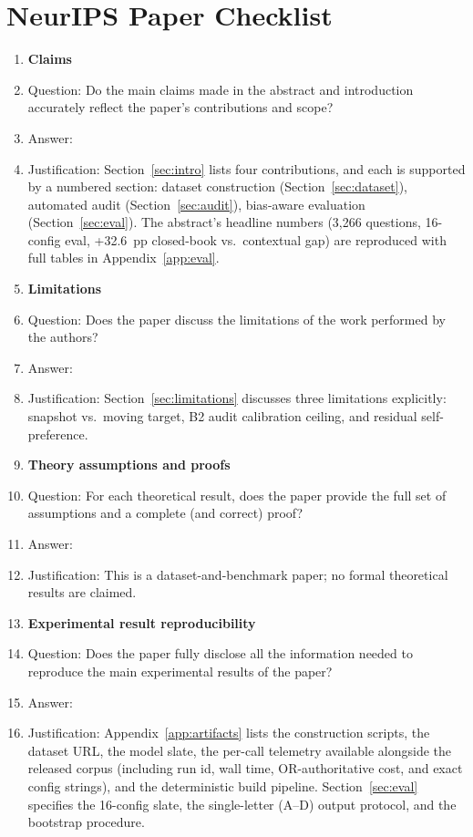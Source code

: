 \section*{NeurIPS Paper Checklist}

\begin{enumerate}

\item {\bf Claims}
    \item[] Question: Do the main claims made in the abstract and introduction accurately reflect the paper's contributions and scope?
    \item[] Answer: \answerYes{}
    \item[] Justification: Section~\ref{sec:intro} lists four contributions, and each is supported by a numbered section: dataset construction (Section~\ref{sec:dataset}), automated audit (Section~\ref{sec:audit}), bias-aware evaluation (Section~\ref{sec:eval}). The abstract's headline numbers (3{,}266 questions, 16-config eval, +32.6~pp closed-book vs.\ contextual gap) are reproduced with full tables in Appendix~\ref{app:eval}.

\item {\bf Limitations}
    \item[] Question: Does the paper discuss the limitations of the work performed by the authors?
    \item[] Answer: \answerYes{}
    \item[] Justification: Section~\ref{sec:limitations} discusses three limitations explicitly: snapshot vs.\ moving target, B2 audit calibration ceiling, and residual self-preference.

\item {\bf Theory assumptions and proofs}
    \item[] Question: For each theoretical result, does the paper provide the full set of assumptions and a complete (and correct) proof?
    \item[] Answer: \answerNA{}
    \item[] Justification: This is a dataset-and-benchmark paper; no formal theoretical results are claimed.

\item {\bf Experimental result reproducibility}
    \item[] Question: Does the paper fully disclose all the information needed to reproduce the main experimental results of the paper?
    \item[] Answer: \answerYes{}
    \item[] Justification: Appendix~\ref{app:artifacts} lists the construction scripts, the dataset URL, the model slate, the per-call telemetry available alongside the released corpus (including run id, wall time, OR-authoritative cost, and exact config strings), and the deterministic build pipeline. Section~\ref{sec:eval} specifies the 16-config slate, the single-letter (A--D) output protocol, and the bootstrap procedure.


\end{enumerate}
